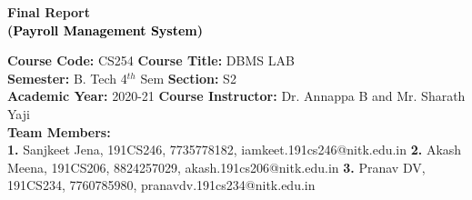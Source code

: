 \documentclass[12pt]{article}
\begin{document}




\begin{center}
    \textbf{\Large{Final Report \\
    (\textcolor{black}{Payroll Management System})}}
\end{center}

\noindent 
\textbf{Course Code:} CS254
\hspace{1.97in} 
\textbf{Course Title:} DBMS LAB \\
\textbf{Semester:} B. Tech 4$^{th}$ Sem 
\hspace{1.59in} 
\textbf{Section:} S2 \\
\textbf{Academic Year:} 2020-21 
\hspace{1.75in} 
\textbf{Course Instructor:} Dr. Annappa B and Mr. Sharath Yaji \\
\textbf{Team Members:} \\
\textbf{1.} Sanjkeet Jena, 191CS246, 7735778182, iamkeet.191cs246@nitk.edu.in 
\newline
\textbf{2.} Akash Meena, 191CS206, 8824257029, akash.191cs206@nitk.edu.in
\newline
\textbf{3.} Pranav DV, 191CS234, 7760785980, pranavdv.191cs234@nitk.edu.in

\vspace{0.25in}
\end{document}
